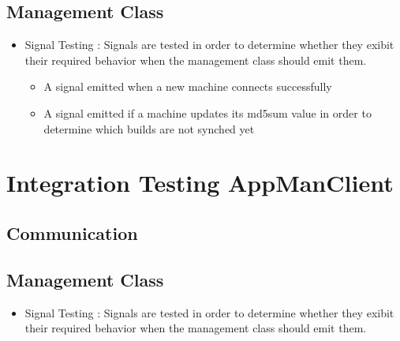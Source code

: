 \documentclass[a4paper,12pt,final]{article}
\begin{document}
\subsection{Management Class}
\begin{itemize}
\item Signal Testing : Signals are tested in order to determine whether they exibit their required behavior when the management class should emit them.
\begin{itemize}
\item A signal emitted when a new machine connects successfully
\item A signal emitted if a machine updates its md5sum value in order to determine which builds are not synched yet
\end{itemize}
\end{itemize}







\section{Integration Testing AppManClient}
\subsection{Communication}

\subsection{Management Class}
\begin{itemize}
\item Signal Testing : Signals are tested in order to determine whether they exibit their required behavior when the management class should emit them.
\end{itemize}
\end{document}
